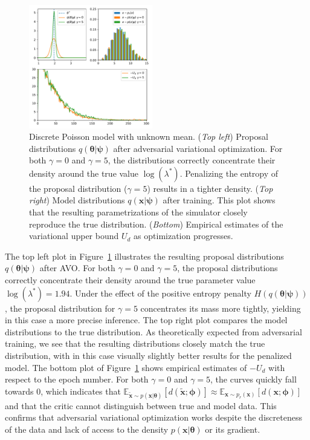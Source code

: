 \documentclass[twocolumn,superscriptaddress,aps]{revtex4-1}
\newcommand{\qxpsi}{q(\mathbf{x}|\bfpsi)}
\newcommand{\bftheta}{{\bm \theta}}
\newcommand{\bfpsi}{{\bm \psi}}
\newcommand{\bfphi}{{\bm \phi}}
\newcommand{\bfx}{\mathbf{x}}
\theoremstyle{plain}
\begin{document}
\begin{figure}
    \centering
    \includegraphics[width=0.48\textwidth]{figures/poisson.pdf}
    \caption{Discrete Poisson model with unknown mean.
             ({\it Top left}) Proposal distributions $q(\bftheta|\bfpsi)$ after adversarial variational optimization. For both $\gamma=0$ and $\gamma=5$, the distributions correctly concentrate their density around
                        the true value $\log(\lambda^*)$. Penalizing the entropy of the proposal distribution ($\gamma=5$) results in a tighter density.
             ({\it Top right}) Model distributions $\qxpsi$ after training. This plot shows that the resulting parametrizations of the simulator closely reproduce the true distribution.
             ({\it Bottom}) Empirical estimates of the variational upper bound $U_d$ as optimization progresses.
             }\label{fig:poisson}
\end{figure}

The top left plot in Figure~\ref{fig:poisson} illustrates the resulting proposal
distributions $q(\bftheta|\bfpsi)$ after AVO.  For
both $\gamma=0$ and $\gamma=5$, the proposal distributions correctly concentrate
their density around the true parameter value $\log(\lambda^*) = 1.94$. Under
the effect of the positive entropy penalty $H(q(\bftheta|\bfpsi))$,
the proposal distribution for $\gamma=5$ concentrates its mass more tightly,
yielding in this case a more precise inference.  The top right plot compares the
model distributions to the true distribution.  As theoretically expected from
adversarial training, we see that the resulting distributions closely match
the true distribution, with in this case visually slightly better results for the penalized
model.  The bottom plot of Figure~\ref{fig:poisson} shows empirical estimates
of $-U_d$ with respect to the epoch number. For both $\gamma=0$ and $\gamma=5$,
the curves quickly fall towards $0$, which indicates that
$\mathbb{E}_{\tilde{\mathbf{x}} \sim p(\mathbf{x}|\bftheta)}
[d(\tilde{\mathbf{x}};\bfphi)] \approx \mathbb{E}_{\mathbf{x} \sim
p_r(\mathbf{x})} [d(\mathbf{x};\bfphi)]$ and that the critic cannot distinguish
between true and model data. This confirms that adversarial variational optimization
works despite the discreteness of the data and lack of access to the
density $p(\bfx | \bftheta)$ or its gradient.
\end{document}
